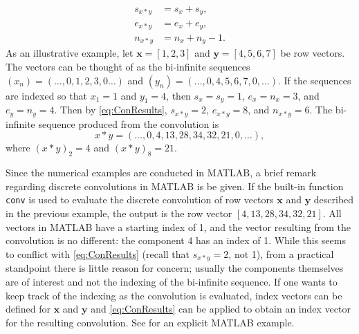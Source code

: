 \documentclass[12pt]{article}
\begin{document}
\begin{align}
s_{x*y} &= s_x + s_y, \nonumber \\
e_{x*y} &= e_x + e_y, \label{eq:ConResults} \\
n_{x*y} &= n_x + n_y - 1. \nonumber
\end{align}
As an illustrative example, let $\mathbf{x} = [1,2,3]$ and $\mathbf{y} = [4,5,6,7]$ be row vectors. The vectors can be thought of as the bi-infinite sequences $(x_n) = (\ldots,0,1,2,3,0\ldots)$ and $(y_n) = (\ldots,0,4,5,6,7,0,\ldots)$. If the sequences are indexed so that $x_1 = 1$ and $y_1 = 4$, then $s_x = s_y = 1$, $e_x = n_x = 3$, and $e_y = n_y = 4$. Then by \eqref{eq:ConResults}, $s_{x*y} = 2$, $e_{x*y} = 8$, and $n_{x*y} = 6$. The bi-infinite sequence produced from the convolution is
\[x*y = (\ldots,0,4,13,28,34,32,21,0,\ldots),\]
where $(x*y)_2 = 4$ and $(x*y)_8 = 21$. \par 
Since the numerical examples are conducted in MATLAB, a brief remark regarding discrete convolutions in MATLAB is be given. If the built-in function \texttt{conv} is used to evaluate the discrete convolution of row vectors $\mathbf{x}$ and $\mathbf{y}$ described in the previous example, the output is the row vector $[4,13,28,34,32,21]$.  All vectors in MATLAB have a starting index of 1, and the vector resulting from the convolution is no different: the component 4 has an index of 1. While this seems to conflict with \eqref{eq:ConResults} (recall that $s_{x*y} = 2$, not 1), from a practical standpoint there is little reason for concern; usually the components themselves are of interest and not the indexing of the bi-infinite sequence. If one wants to keep track of the indexing as the convolution is evaluated, index vectors can be defined for $\mathbf{x}$ and $\mathbf{y}$ and \eqref{eq:ConResults} can be applied to obtain an index vector for the resulting convolution. See \cite{BoggessAlbert2001Afci} for an explicit MATLAB example. \par 
\end{document}
